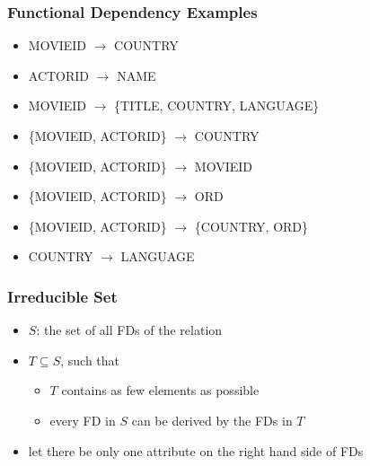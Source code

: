 \documentclass[dvipsnames]{beamer}
\begin{document}
\begin{frame}
  \frametitle{Functional Dependency Examples}

  \begin{example}
    \begin{itemize}
      \item MOVIEID $\rightarrow$ COUNTRY

      \pause
      \item ACTORID $\rightarrow$ NAME

      \pause
      \item MOVIEID $\rightarrow$ \{TITLE, COUNTRY, LANGUAGE\}

      \pause
      \item \{MOVIEID, ACTORID\} $\rightarrow$ COUNTRY

      \pause
      \item \{MOVIEID, ACTORID\} $\rightarrow$ MOVIEID

      \pause
      \item \{MOVIEID, ACTORID\} $\rightarrow$ ORD

      \pause
      \item \{MOVIEID, ACTORID\} $\rightarrow$ \{COUNTRY, ORD\}

      \pause
      \item COUNTRY $\rightarrow$ LANGUAGE
    \end{itemize}
  \end{example}
\end{frame}

\begin{frame}
  \frametitle{Irreducible Set}

  \begin{itemize}
    \item $S$: the set of all FDs of the relation

    \item $T \subseteq S$, such that
    \begin{itemize}
      \item $T$ contains as few elements as possible
      \item every FD in $S$ can be derived by the FDs in $T$
    \end{itemize}

    \pause
    \medskip
    \item let there be only one attribute on the right hand side of FDs
  \end{itemize}
\end{frame}
\end{document}
